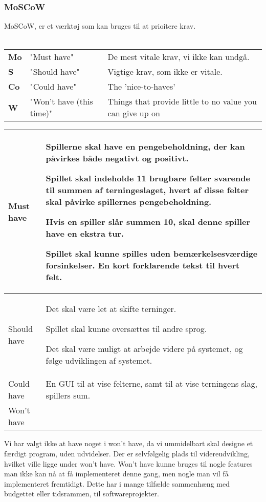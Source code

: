 \subsubsection{MoSCoW}
MoSCoW, er et værktøj som kan bruges til at prioitere krav. \\\\
\begin{tabular}{lll}
    \textbf{Mo} &   
    "Must have"                 &
    De mest vitale krav, vi ikke kan undgå. \\

    \textbf{S}  &   
    "Should have"               & 
    Vigtige krav, som ikke er vitale. \\

    \textbf{Co} &   
    "Could have"                & 
    The 'nice-to-haves' \\

    \textbf{W}  &   
    "Won’t have (this time)"    & 
    Things that provide little to no value you can give up on \\
    
\end{tabular}

\begin{center}
    \begin{tabular}{ | l | p{13cm} |}
    \hline
    Must have & Spillerne skal have en pengebeholdning, der kan påvirkes både negativt og positivt.

    Spillet skal indeholde 11 brugbare felter svarende til summen af terningeslaget, hvert af disse felter skal påvirke spillernes pengebeholdning.

    Hvis en spiller slår summen 10, skal denne spiller have en ekstra tur.

    Spillet skal kunne spilles uden bemærkelsesværdige forsinkelser. En kort forklarende tekst til hvert felt. \\
    
    \hline
    Should have & Det skal være let at skifte terninger.

    Spillet skal kunne oversættes til andre sprog.

    Det skal være muligt at arbejde videre på systemet, og følge udviklingen af systemet. \\
    \hline
    Could have & En GUI til at vise felterne, samt til at vise terningens slag, spillers sum. \\
    \hline
    Won't have &  \\
    \hline
    \end{tabular}
\end{center}

\noindent
Vi har valgt ikke at have noget i won't have, da vi ummidelbart skal designe et færdigt program, uden udvidelser. 
Der er selvfølgelig plads til videreudvikling, hvilket ville ligge under won't have. 
Won't have kunne bruges til nogle features man ikke kan nå at få implementeret denne gang, men nogle man vil få implementeret fremtidigt. 
Dette har i mange tilfælde sammenhæng med budgettet eller tidsrammen, til softwareprojekter.
